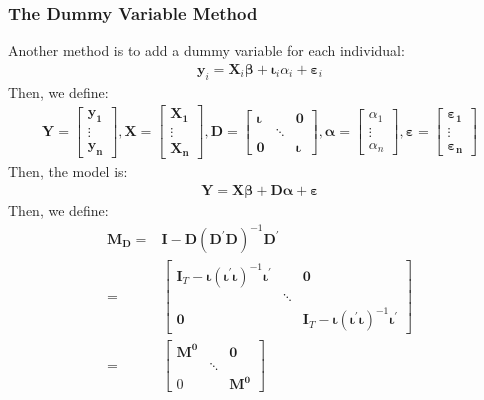 \documentclass{article}
\begin{document}
\subsubsection{The Dummy Variable Method}
Another method is to add a dummy variable for each individual:
	\begin{align*}
		\boldsymbol{y}_i = \boldsymbol{X}_i \boldsymbol{\beta} + \boldsymbol{\iota}_i \alpha_i + \boldsymbol{\varepsilon}_i
	\end{align*}
Then, we define:
	\begin{align*}
		\boldsymbol{Y} = 
		\begin{bmatrix}
			\boldsymbol{y_1}\\
			\vdots\\
			\boldsymbol{y_n}
		\end{bmatrix},
		\boldsymbol{X} = 
		\begin{bmatrix}
			\boldsymbol{X_1}\\
			\vdots\\
			\boldsymbol{X_n}
		\end{bmatrix},
		\boldsymbol{D} = 
		\begin{bmatrix}
			\boldsymbol{\iota} & & \boldsymbol{0}\\
			& \ddots &\\
			\boldsymbol{0} & & \boldsymbol{\iota}
		\end{bmatrix},
		\boldsymbol{\alpha} = 
		\begin{bmatrix}
			\alpha_1\\
			\vdots\\
			\alpha_n
		\end{bmatrix},
		\boldsymbol{\varepsilon} =
		\begin{bmatrix}
			\boldsymbol{\varepsilon_1}\\
			\vdots\\
			\boldsymbol{\varepsilon_n}
		\end{bmatrix}
	\end{align*}
Then, the model is:
	\begin{align*}
		\boldsymbol{Y} = \boldsymbol{X} \boldsymbol{\beta} + \boldsymbol{D} \boldsymbol{\alpha} + \boldsymbol{\varepsilon}
	\end{align*}
Then, we define:
	\begin{align*}
		\boldsymbol{M_D} = &\boldsymbol{I} - \boldsymbol{D} (\boldsymbol{D}^\prime \boldsymbol{D})^{-1} \boldsymbol{D}^\prime\\ = &
		\begin{bmatrix}
			\boldsymbol{I}_T - \boldsymbol{\iota} (\boldsymbol{\iota}^\prime \boldsymbol{\iota})^{-1} \boldsymbol{\iota}^\prime & & \boldsymbol{0}\\
			& \ddots &\\
			\boldsymbol{0} & & \boldsymbol{I}_T - \boldsymbol{\iota} (\boldsymbol{\iota}^\prime \boldsymbol{\iota})^{-1} \boldsymbol{\iota}^\prime 
		\end{bmatrix}\\ = &
		\begin{bmatrix}
			\boldsymbol{M^0} & & \boldsymbol{0}\\
			& \ddots &\\
			0 & & \boldsymbol{M^0}
		\end{bmatrix}
	\end{align*}
\end{document}
